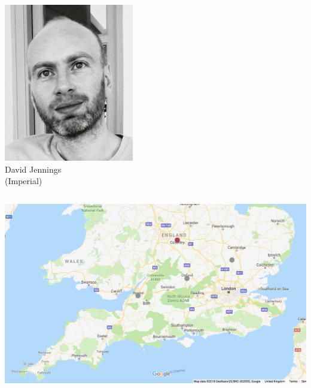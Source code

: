 \documentclass[aspectratio=169]{beamer}
\begin{document}
\begin{frame}
\begin{columns}
\begin{column}{0.25\textwidth}
\includegraphics[width=\textwidth]{jennings.jpg}\\
David Jennings\\
(Imperial)
\end{column}
\end{columns}
\end{frame}


\begin{frame}
\includegraphics[width=\textwidth]{map4.png}
\end{frame}
\end{document}
